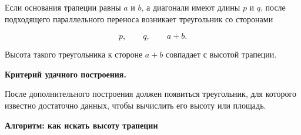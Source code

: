 \documentclass[a4paper,12pt]{article}
\newcommand{\important}[1]{
  \textbf{\color{darkaccent}#1}
}
\begin{document}
Если основания трапеции равны $a$ и $b$, а диагонали имеют длины
$p$ и $q$, после подходящего параллельного переноса возникает треугольник
со сторонами

\[
p,\qquad q,\qquad a+b.
\]

Высота такого треугольника к стороне $a+b$ совпадает с высотой трапеции.

\important{Критерий удачного построения.}
После дополнительного построения должен появиться треугольник, для которого
известно достаточно данных, чтобы вычислить его высоту или площадь.


\clearpage
\thispagestyle{empty}

\begin{center}
{\Large\color{darkaccent}\textbf{
Алгоритм: как искать высоту трапеции
}}
\end{center}

\vspace{1.4em}
\end{document}
